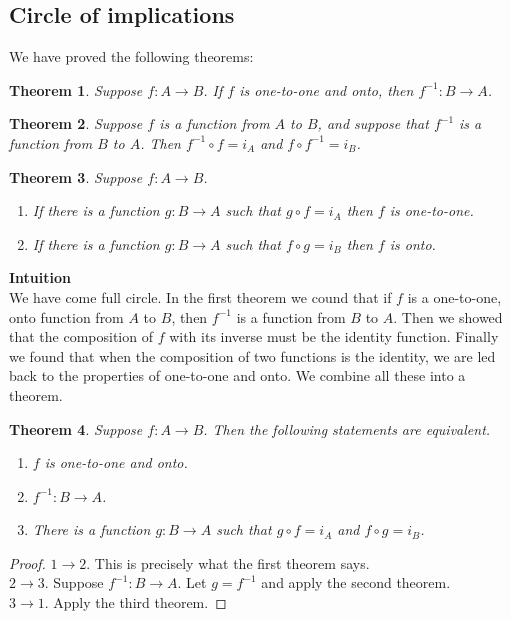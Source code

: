 \documentclass{report}
\newtheorem*{theorem}{Theorem}
\theoremstyle{definition}
\begin{document}
\subsection{Circle of implications}
We have proved the following theorems:
\begin{theorem}
Suppose $f:A\to B$. If $f$ is one-to-one and onto, then $f^{-1}:B\to A$.
\end{theorem}
\begin{theorem}
Suppose $f$ is a function from $A$ to $B$, and suppose that $f^{-1}$ is a function from $B$ to $A$. Then $f^{-1}\circ f=i_A$ and $f\circ f^{-1}=i_B$.
\end{theorem}
\begin{theorem}
Suppose $f:A\to B$.
\begin{enumerate}
\item If there is a function $g:B\to A$ such that $g\circ f=i_A$ then $f$ is one-to-one.
\item If there is a function $g:B\to A$ such that $f\circ g=i_B$ then $f$ is onto.
\end{enumerate}
\end{theorem}
\noindent\textbf{Intuition}\\
We have come full circle. In the first theorem we cound that if $f$ is a one-to-one, onto function from $A$ to $B$, then $f^{-1}$ is a function from $B$ to $A$. Then we showed that the composition
of $f$ with its inverse must be the identity function. Finally we found that when the composition of two functions is the identity, we are led back to the properties of one-to-one and onto. 
We combine all these into a theorem.
\begin{theorem}
Suppose $f:A\to B$. Then the following statements are equivalent.
\begin{enumerate}
\item $f$ is one-to-one and onto.
\item $f^{-1}:B\to A$.
\item There is a function $g:B\to A$ such that $g\circ f=i_A$ and $f\circ g=i_B$.
\end{enumerate}
\end{theorem}
\begin{proof}
$1\to2$. This is precisely what the first theorem says.\\
\indent$2\to3$. Suppose $f^{-1}:B\to A$. Let $g=f^{-1}$ and apply the second theorem.\\
\indent$3\to1$. Apply the third theorem.\qedhere
\end{proof}
\newpage
\end{document}
